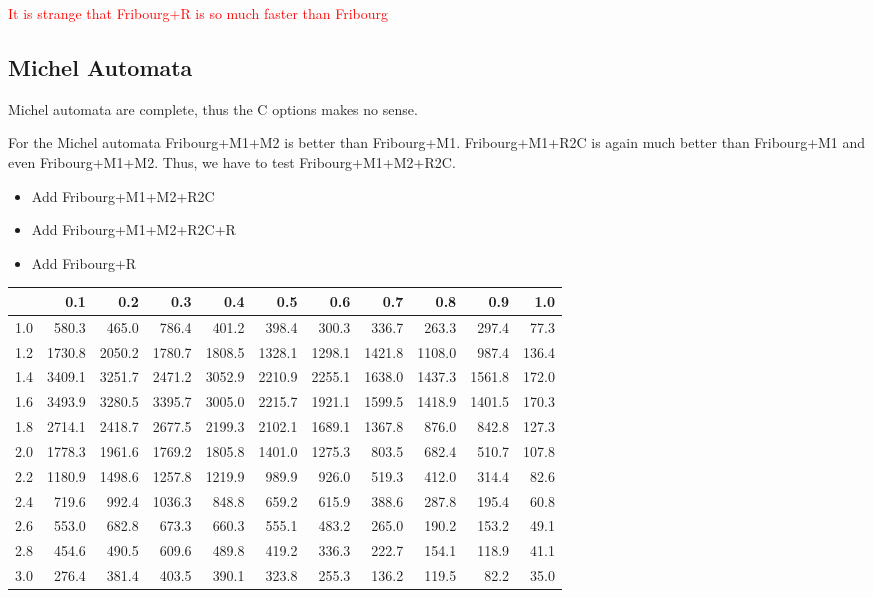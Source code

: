 \textcolor{red}{It is strange that Fribourg+R is so much faster than Fribourg}



\subsection{Michel Automata}
Michel automata are complete, thus the C options makes no sense.

For the Michel automata Fribourg+M1+M2 is better than Fribourg+M1. Fribourg+M1+R2C is again much better than Fribourg+M1 and even Fribourg+M1+M2. Thus, we have to test Fribourg+M1+M2+R2C. 

\begin{itemize}
\item Add Fribourg+M1+M2+R2C
\item Add Fribourg+M1+M2+R2C+R
\item Add Fribourg+R
\end{itemize}



\begin{tabular}{r|rrrrrrrrrr}
  \hline
 & 0.1 & 0.2 & 0.3 & 0.4 & 0.5 & 0.6 & 0.7 & 0.8 & 0.9 & 1.0 \\ 
  \hline
1.0 & 580.3 & 465.0 & 786.4 & 401.2 & 398.4 & 300.3 & 336.7 & 263.3 & 297.4 & 77.3 \\ 
  1.2 & 1730.8 & 2050.2 & 1780.7 & 1808.5 & 1328.1 & 1298.1 & 1421.8 & 1108.0 & 987.4 & 136.4 \\ 
  1.4 & 3409.1 & 3251.7 & 2471.2 & 3052.9 & 2210.9 & 2255.1 & 1638.0 & 1437.3 & 1561.8 & 172.0 \\ 
  1.6 & 3493.9 & 3280.5 & 3395.7 & 3005.0 & 2215.7 & 1921.1 & 1599.5 & 1418.9 & 1401.5 & 170.3 \\ 
  1.8 & 2714.1 & 2418.7 & 2677.5 & 2199.3 & 2102.1 & 1689.1 & 1367.8 & 876.0 & 842.8 & 127.3 \\ 
  2.0 & 1778.3 & 1961.6 & 1769.2 & 1805.8 & 1401.0 & 1275.3 & 803.5 & 682.4 & 510.7 & 107.8 \\ 
  2.2 & 1180.9 & 1498.6 & 1257.8 & 1219.9 & 989.9 & 926.0 & 519.3 & 412.0 & 314.4 & 82.6 \\ 
  2.4 & 719.6 & 992.4 & 1036.3 & 848.8 & 659.2 & 615.9 & 388.6 & 287.8 & 195.4 & 60.8 \\ 
  2.6 & 553.0 & 682.8 & 673.3 & 660.3 & 555.1 & 483.2 & 265.0 & 190.2 & 153.2 & 49.1 \\ 
  2.8 & 454.6 & 490.5 & 609.6 & 489.8 & 419.2 & 336.3 & 222.7 & 154.1 & 118.9 & 41.1 \\ 
  3.0 & 276.4 & 381.4 & 403.5 & 390.1 & 323.8 & 255.3 & 136.2 & 119.5 & 82.2 & 35.0 \\ 
   \hline
\end{tabular}

